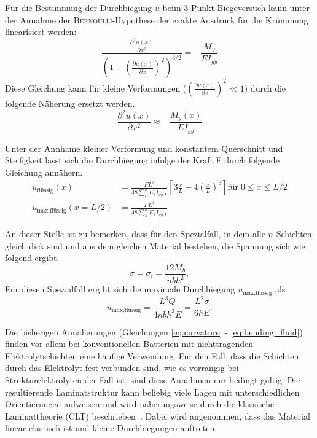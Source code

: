 Für die Bestimmung der Durchbiegung $u$ beim 3-Punkt-Biegeversuch kann 
unter der Annahme der \textsc{Bernoulli}-Hypothese der exakte Ausdruck für die Krümmung linearisiert werden:
\begin{equation}
\frac{\frac{\partial^2 u(x)}{\partial x^2}}{\left(1 + \left(\frac{\partial u(x)}{\partial x} \right)^2 \right)^{3/2}} = -\frac{M_y}{E I_{yy}}
\end{equation}
Diese Gleichung kann für kleine Verformungen ($(\frac{\partial u(x)}{\partial x})^2 \ll 1$) durch die folgende Näherung ersetzt werden.
\begin{equation}
    \frac{\partial^2 u(x)}{\partial x^2} \approx -\frac{M_y(x)}{E I_{yy}}
\end{equation}

Unter der Annhame kleiner Verformung und konstantem Querschnitt und Steifigkeit lässt sich die Durchbiegung infolge der Kraft F durch folgende Gleichung annähern.
\begin{align}
    u_\text{flüssig} (x) &= \frac{F L^3}{48 \sum_{k}^{n} E_k I_{yy,k}} \left[ 3 \frac{x}{L} - 4\left(\frac{x}{L}\right)^3 \right] \text{für} \; 0 \leq x \leq L/2 \\
    u_\text{max,flüssig} (x = L/2) &= \frac{FL^3}{48 \sum_{k}^{n} E_k I_{yy,k}} \label{eq:bending_sbe_0}
\end{align}



An dieser Stelle ist zu bemerken, dass für den Spezialfall, in dem alle $n$ Schichten gleich dick sind und aus dem gleichen Material bestehen, die Spannung sich wie folgend ergibt.
\begin{equation}
    \sigma = \sigma_i = \frac{12 M_{b}}{n b h^2},
\end{equation}
Für diesen Spezialfall ergibt sich die maximale Durchbiegung $u_\text{max,flüssig} $ als
\begin{equation}
    \label{eq:bending_fluid}
    u_\text{max,flüssig}  = \frac{L^3 Q}{4 n b h^3 E} = \frac{L^2 \sigma}{6 h E}.
\end{equation}


Die bisherigen Annäherungen (Gleichungen \ref{eq:curvature} - \ref{eq:bending_fluid}) finden vor allem bei konventionellen Batterien mit nichttragenden Elektrolytschichten eine häufige Verwendung. Für den Fall, dass die Schichten durch das Elektrolyt fest verbunden sind, wie es vorrangig bei Strukturelektrolyten der Fall ist, sind diese Annahmen nur bedingt gültig. Die resultierende Laminatstruktur kann beliebig viele Lagen mit unterschiedlichen Orientierungen aufweisen und wird näherungsweise durch die klassische Laminattheorie (CLT) beschrieben~\cite{Carlstedt2018}. Dabei wird angenommen, dass das Material linear-elastisch ist und kleine Durchbiegungen auftreten.


